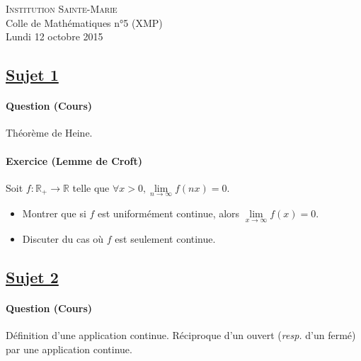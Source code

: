 \documentclass[12pt,a4paper]{report}
\begin{document}
\newcommand{\rA}{\mathcal{A}}
\newcommand{\rB}{\mathcal{B}}
\newcommand{\rC}{\mathcal{C}}
\newcommand{\rG}{\mathcal{G}}
\newcommand{\rF}{\mathcal{F}}
\newcommand{\rO}{\mathcal{O}}
\newcommand{\rP}{\mathcal{P}}
\newcommand{\rH}{\mathcal{H}}
\newcommand{\rR}{\mathcal{R}}
\newcommand{\rE}{\mathcal{E}}
\newcommand{\rL}{\mathcal{L}}
\newcommand{\rM}{\mathcal{M}}
\newcommand{\bK}{\mathbb{K}}
\newcommand{\bQ}{\mathbb{Q}}
\newcommand{\bR}{\mathbb{R}}
\newcommand{\bZ}{\mathbb{Z}}
\newcommand{\bN}{\mathbb{N}}
\newcommand{\bC}{\mathbb{C}}
\newcommand{\bP}{\mathbb{P}}
\newcommand{\bF}{\mathbb{F}}

\ifpdf
{}
\else
{}
\fi

\pagestyle{empty} %

\noindent \textsc{Institution Sainte-Marie}\\
Colle de Mathématiques n°5 (XMP)\\
Lundi 12 octobre 2015


\subsection*{\underline{Sujet 1}}
\paragraph*{Question (Cours)} %
Théorème de Heine.

\paragraph*{Exercice (Lemme de Croft)} %
Soit $f : \bR_+ \rightarrow \bR$ telle que $\forall x >0, \lim\limits_{n\rightarrow\infty}f(nx)=0$.
\begin{itemize}
\item Montrer que si $f$ est uniformément continue, alors $\lim\limits_{x\rightarrow\infty}f(x)=0$.
\item Discuter du cas où $f$ est seulement continue.
\end{itemize}

\subsection*{\underline{Sujet 2}}
\paragraph*{Question (Cours)} %
Définition d'une application continue. Réciproque d'un ouvert (\emph{resp.} d'un fermé) par une application continue.
\end{document}
